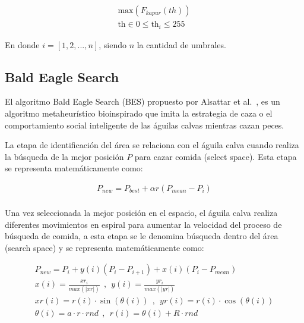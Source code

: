\documentclass[conference]{IEEEtran}
\begin{document}
\begin{equation}
\begin{gathered}
\text{max}(F_{kapur}(th)) \\
\text{th} \in 0 \leq \text{th}_i \leq 255
\end{gathered}
\label{eq10}
\end{equation}

\noindent En donde $i=[1,2,...,n]$, siendo $n$ la cantidad de umbrales.

\subsection{Bald Eagle Search}

\noindent El algoritmo Bald Eagle Search (BES) propuesto por Alsattar et al.~\cite{Alsattar2019}, es un algoritmo metaheurístico bioinspirado que imita la estrategia de caza o el comportamiento social inteligente de las águilas calvas mientras cazan peces. 

\noindent La etapa de identificación del área se relaciona con el águila calva cuando realiza la búsqueda de la mejor posición $P$ para cazar comida (select space). Esta etapa se representa matemáticamente como:

\begin{equation}
\begin{gathered}
P_{new}=P_{best}+{\alpha}r(P_{mean}-P_{i})\\
\end{gathered}
\label{eq11}
\end{equation}

\noindent Una vez seleccionada la mejor posición en el espacio, el águila calva realiza diferentes movimientos en espiral para aumentar la velocidad del proceso de búsqueda de comida, a esta etapa se le denomina búsqueda dentro del área (search space) y se representa matemáticamente como:

\begin{equation}
\begin{gathered}
P_{new}=P_{i}+y(i)(P_{i}-P_{i+1})+x(i)(P_{i}-P_{mean}) \\
x(i)= \frac{xr_{i}}{max(\lvert xr \rvert)} ~\ , ~\ y(i)= \frac{yr_{i}}{max(\lvert yr \rvert)} \\
xr(i)=r(i)\cdot \sin (\theta(i)) ~\ , ~\ yr(i)=r(i)\cdot \cos (\theta(i)) \\
\theta(i)=a\cdot r\cdot rnd ~\ , ~\ r(i)=\theta(i)+R \cdot rnd 
\end{gathered}
\label{eq12}
\end{equation}
\end{document}
